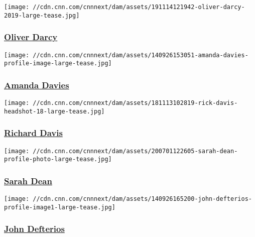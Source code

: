 \href{/profiles/oliver-darcy}{}

\texttt{[image: //cdn.cnn.com/cnnnext/dam/assets/191114121942-oliver-darcy-2019-large-tease.jpg]}

\hypertarget{oliver-darcy}{%
\subsubsection{\texorpdfstring{\href{/profiles/oliver-darcy}{Oliver
Darcy}}{Oliver Darcy}}\label{oliver-darcy}}

\href{/profiles/amanda-davies}{}

\texttt{[image: //cdn.cnn.com/cnnnext/dam/assets/140926153051-amanda-davies-profile-image-large-tease.jpg]}

\hypertarget{amanda-davies}{%
\subsubsection{\texorpdfstring{\href{/profiles/amanda-davies}{Amanda
Davies}}{Amanda Davies}}\label{amanda-davies}}

\href{/profiles/richard-davis-profile}{}

\texttt{[image: //cdn.cnn.com/cnnnext/dam/assets/181113102819-rick-davis-headshot-18-large-tease.jpg]}

\hypertarget{richard-davis}{%
\subsubsection{\texorpdfstring{\href{/profiles/richard-davis-profile}{Richard
Davis}}{Richard Davis}}\label{richard-davis}}

\href{/profiles/sarah-dean-profile}{}

\texttt{[image: //cdn.cnn.com/cnnnext/dam/assets/200701122605-sarah-dean-profile-photo-large-tease.jpg]}

\hypertarget{sarah-dean}{%
\subsubsection{\texorpdfstring{\href{/profiles/sarah-dean-profile}{Sarah
Dean}}{Sarah Dean}}\label{sarah-dean}}

\href{/profiles/john-defterios}{}

\texttt{[image: //cdn.cnn.com/cnnnext/dam/assets/140926165200-john-defterios-profile-image1-large-tease.jpg]}

\hypertarget{john-defterios}{%
\subsubsection{\texorpdfstring{\href{/profiles/john-defterios}{John
Defterios}}{John Defterios}}\label{john-defterios}}

